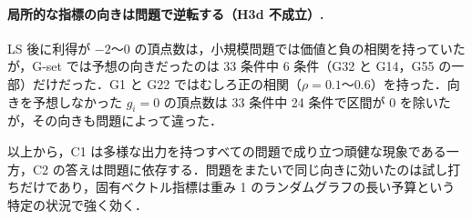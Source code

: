 \paragraph{局所的な指標の向きは問題で逆転する（H3d 不成立）.} LS 後に利得が $-2$〜$0$ の頂点数は，小規模問題では価値と負の相関を持っていたが，G-set では予想の向きだったのは 33 条件中 6 条件（G32 と G14，G55 の一部）だけだった．G1 と G22 ではむしろ正の相関（$\rho=0.1$〜$0.6$）を持った．向きを予想しなかった $g_i=0$ の頂点数は 33 条件中 24 条件で区間が 0 を除いたが，その向きも問題によって違った．

以上から，C1 は多様な出力を持つすべての問題で成り立つ頑健な現象である一方，C2 の答えは問題に依存する．問題をまたいで同じ向きに効いたのは試し打ちだけであり，固有ベクトル指標は重み 1 のランダムグラフの長い予算という特定の状況で強く効く．
